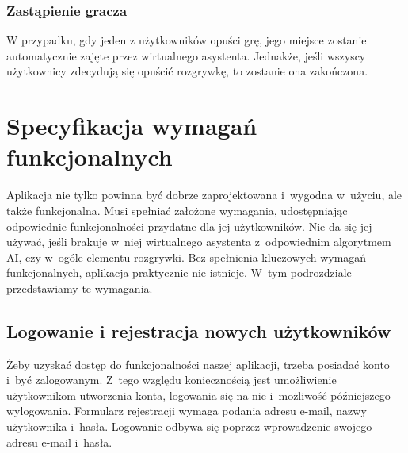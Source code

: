 \FloatBarrier


\subsubsection{Zastąpienie gracza}
W przypadku, gdy jeden z użytkowników opuści grę, jego miejsce zostanie automatycznie
zajęte przez wirtualnego asystenta. Jednakże, jeśli wszyscy użytkownicy
zdecydują się opuścić rozgrywkę, to zostanie ona zakończona.






\section{Specyfikacja wymagań funkcjonalnych}

Aplikacja nie tylko powinna być dobrze zaprojektowana i~wygodna
w~użyciu, ale także funkcjonalna. Musi spełniać założone wymagania,
udostępniając odpowiednie funkcjonalności przydatne dla
jej użytkowników. Nie da się jej używać, jeśli brakuje w~niej
wirtualnego asystenta z~odpowiednim
algorytmem AI, czy w~ogóle elementu
rozgrywki. Bez spełnienia kluczowych wymagań funkcjonalnych,
aplikacja praktycznie nie istnieje. W~tym podrozdziale przedstawiamy
te wymagania.


\subsection{Logowanie i rejestracja nowych użytkowników}
Żeby uzyskać dostęp do funkcjonalności naszej aplikacji, trzeba
posiadać konto i~być zalogowanym. Z~tego względu koniecznością
jest umożliwienie użytkownikom utworzenia konta, logowania się na
nie i~możliwość późniejszego wylogowania. Formularz rejestracji wymaga
podania adresu e-mail, nazwy użytkownika i~hasła. Logowanie odbywa się
poprzez wprowadzenie swojego adresu e-mail i~hasła.


